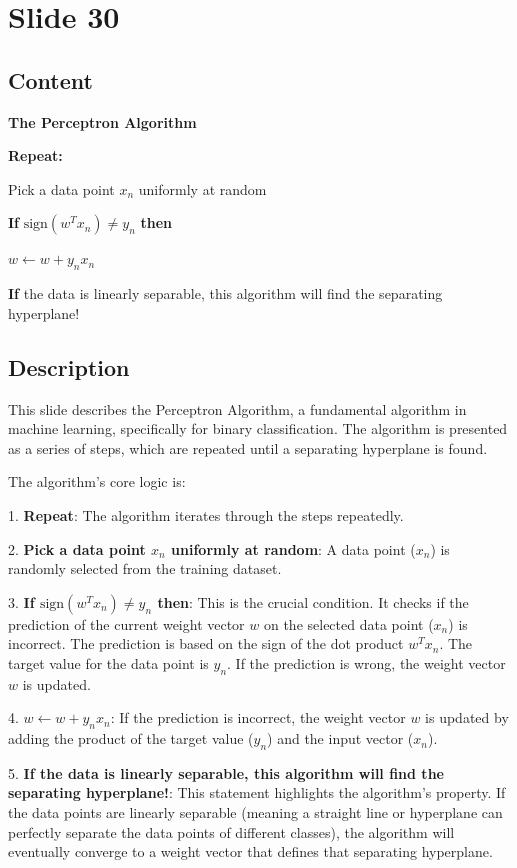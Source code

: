 \documentclass{article}%
\begin{document}
%
\newpage%
\section{Slide 30}%
\label{sec:Slide30}%
\subsection{Content}%

\textbf{The Perceptron Algorithm}

\textbf{Repeat:}

Pick a data point $x_n$ uniformly at random

\textbf{If} $\text{sign}(w^T x_n) \neq y_n$ \textbf{then}

$w \leftarrow w + y_n x_n$

\textbf{If} the data is linearly separable, this algorithm will find the separating hyperplane!
%
\subsection{Description}%
This slide describes the Perceptron Algorithm, a fundamental algorithm in machine learning, specifically for binary classification.  The algorithm is presented as a series of steps, which are repeated until a separating hyperplane is found.

The algorithm's core logic is:

1.  \textbf{Repeat}: The algorithm iterates through the steps repeatedly.

2.  \textbf{Pick a data point $x_n$ uniformly at random}:  A data point ($x_n$) is randomly selected from the training dataset.

3.  \textbf{If $\text{sign}(w^T x_n) \neq y_n$ then}:  This is the crucial condition.  It checks if the prediction of the current weight vector $w$ on the selected data point ($x_n$) is incorrect.  The prediction is based on the sign of the dot product $w^T x_n$.  The target value for the data point is $y_n$.  If the prediction is wrong, the weight vector $w$ is updated.

4.  \textbf{$w \leftarrow w + y_n x_n$}:  If the prediction is incorrect, the weight vector $w$ is updated by adding the product of the target value ($y_n$) and the input vector ($x_n$).

5.  \textbf{If the data is linearly separable, this algorithm will find the separating hyperplane!}: This statement highlights the algorithm's property.  If the data points are linearly separable (meaning a straight line or hyperplane can perfectly separate the data points of different classes), the algorithm will eventually converge to a weight vector that defines that separating hyperplane.
\end{document}

